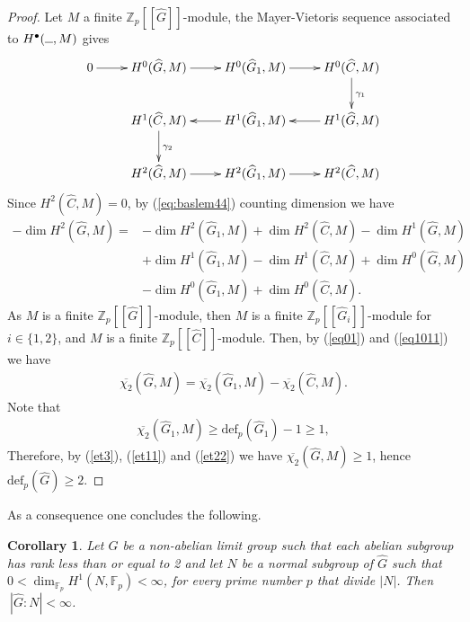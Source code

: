 \documentclass[10pt]{amsart}
\theoremstyle{plain}
\newtheorem{cor}[prop]{Corollary}
\theoremstyle{definition}
\theoremstyle{remark}
\numberwithin{prop}{section}
\numberwithin{example}{section}
\numberwithin{equation}{section}
\newcommand{\Z}{\mathbb{Z}}
\newcommand{\F}{\mathbb{F}}
\newcommand{\de}{\mathrm{def}}
\newcommand{\argu}{\hbox to 1.5ex{\hrulefill}}  %
\begin{document}
\begin{proof}
		Let  $M$ a finite $\Z_p[[\widehat{G}]]$-module,  the Mayer-Vietoris sequence associated to
		$H^\bullet(\argu,M)$  gives 
		\begin{equation}
		\label{eq:baslem44}
		\xymatrix{
			0 \ar[r]	& H^0(\widehat{G},M)\ar[r]& 
			H^0(\widehat{G}_1,M)\ar[r]&
			H^0(\widehat{C},M)\ar[d]^{\gamma_1}\\
			&H^1(\widehat{C},M)\ar[d]^{\gamma_2}& 
			H^1(\widehat{G}_1,M)\ar[l]&
			H^1(\widehat{G},M)\ar[l]\\
			& 	H^2(\widehat{G},M)\ar[r]&H^2(\widehat{G}_1,M)\ar[r]&H^2(\widehat{C},M)
		} 
		\end{equation} 
		Since  $H^2(\widehat{C},M)=0$, by  (\ref{eq:baslem44}) counting dimension we have   
		\begin{align}\label{eq1011}
				-\dim H^2(\widehat{G},M)=&-\dim H^2(\widehat{G}_1,M)+\dim H^2(\widehat{C},M) -\dim H^1(\widehat{G},M) \\ &\nonumber +
			\dim H^1(\widehat{G}_1,M) -\dim H^1(\widehat{C},M)+\dim H^0(\widehat{G},M) \\ &\nonumber -\dim H^0(\widehat{G}_1,M)+\dim H^0(\widehat{C},M).
		\end{align}	
		As  $M$ is  a finite $\Z_p[[\widehat{G}]]$-module, then  $M$ is  a finite  $\Z_p[[\widehat{G}_i]]$-module for $i\in\{1,2\}$, and  $M$ is a  finite $\Z_p[[\widehat{C}]]$-module. Then, by  (\ref{eq01}) and  (\ref{eq1011}) we have 
		\begin{align}\label{et11}
				\overline{\chi_2}(\widehat{G},M)=	\overline{\chi_2}(\widehat{G}_1,M)-	\overline{\chi_2}(\widehat{C},M).
		\end{align}
		Note that  
		\begin{align}\label{et22}
				\overline{\chi_2}(\widehat{G}_1,M)\geq \de_p(\widehat{G}_1)-1\geq 1,
		\end{align} 
		Therefore, by (\ref{et3}), (\ref{et11}) and (\ref{et22})   we have  
		$	\overline{\chi_2}(\widehat{G},M)\geq 1$, hence $\de_p(\widehat{G})\geq 2$.
		
	\end{proof}
	
	As a consequence one concludes the following.
	
	\begin{cor}\label{pr6.1}
		Let  $G$ be a non-abelian limit group   such that each abelian subgroup has  rank less than or equal to 2 and  let $N$ be   a  normal subgroup of $\widehat{G}$ such that $0<\dim_{\F_p}H^1(N,\F_p)<\infty$, for every prime number $p$ that divide $|N|$. Then  $~|\widehat{G}:N|<\infty$.
	\end{cor}
	
\end{document}
